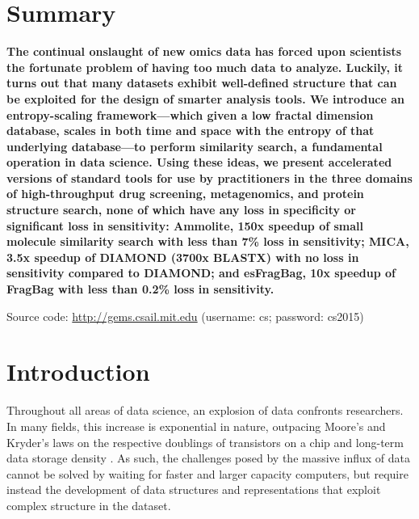 \documentclass[review,preprint,12pt]{elsarticle}
\renewcommand{\cite}{\citep} %
\theoremstyle{definition}
\theoremstyle{remark}
\numberwithin{equation}{section}
\begin{document}
\section{Summary}
{ \bfseries
    The continual onslaught of new omics data has forced upon scientists the fortunate problem of having too much data to analyze.
    Luckily, it turns out that many datasets exhibit well-defined structure that can be exploited for the design of 
smarter analysis tools.
    We introduce an entropy-scaling framework---which given a low fractal dimension database, scales in both time and space with the entropy of that underlying database---to perform similarity search, a fundamental operation in data science.
    Using these ideas, we present accelerated versions of standard tools for use by practitioners in the three domains of high-throughput drug screening, metagenomics, and protein structure search, none of which have any loss in specificity or significant loss in sensitivity:
    Ammolite, 150x speedup of small molecule similarity search with less than 7\% loss in sensitivity; MICA, 3.5x speedup of DIAMOND (3700x BLASTX) with no loss in sensitivity compared to DIAMOND; and esFragBag, 10x speedup of FragBag with less than 0.2\% loss in sensitivity.

    Source code: \url{http://gems.csail.mit.edu} (username: cs; password: cs2015)
}

\section{Introduction}
Throughout all areas of data science, an explosion of data confronts 
researchers.
In many fields, this increase is exponential in nature, outpacing Moore's and Kryder's laws on the respective doublings of transistors on a chip and long-term data storage density \cite{kahn2011future}.
As such, the challenges posed by the massive influx of data cannot be solved by waiting for faster and larger capacity computers, but require instead the development of data structures and representations that exploit complex
structure in the dataset.
\end{document}
